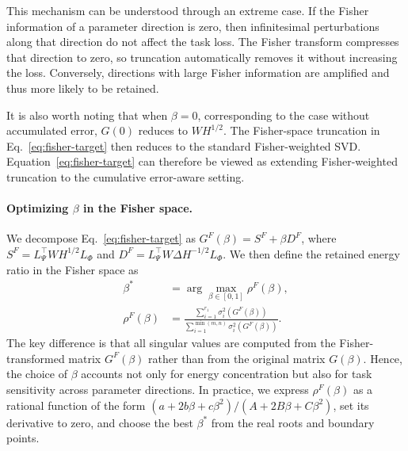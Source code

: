\documentclass[a4paper,fleqn]{cas-dc}
\begin{document}
This mechanism can be understood through an extreme case. If the Fisher information of a parameter direction is zero, then infinitesimal perturbations along that direction do not affect the task loss. The Fisher transform compresses that direction to zero, so truncation automatically removes it without increasing the loss. Conversely, directions with large Fisher information are amplified and thus more likely to be retained.

It is also worth noting that when $\beta = 0$, corresponding to the case without accumulated error, $G(0)$ reduces to $WH^{1/2}$. The Fisher-space truncation in Eq.~\eqref{eq:fisher-target} then reduces to the standard Fisher-weighted SVD. Equation~\eqref{eq:fisher-target} can therefore be viewed as extending Fisher-weighted truncation to the cumulative error-aware setting.

\paragraph{Optimizing $\beta$ in the Fisher space.}
We decompose Eq.~\eqref{eq:fisher-target} as $G^F(\beta) = S^F + \beta D^F$, where $S^F = L_\Psi^\top W H^{1/2} L_\Phi$ and $D^F = L_\Psi^\top W \Delta H^{-1/2} L_\Phi$. We then define the retained energy ratio in the Fisher space as
\begin{equation}
\begin{aligned}
\beta^* &= \arg\max_{\beta \in [0,1]} \rho^F(\beta), \\
\rho^F(\beta) &= \frac{\sum_{i=1}^{r_1} \sigma_i^2(G^F(\beta))}{\sum_{i=1}^{\min(m,n)} \sigma_i^2(G^F(\beta))}.
\end{aligned}
\label{eq:fisher-rer}
\end{equation}
The key difference is that all singular values are computed from the Fisher-transformed matrix $G^F(\beta)$ rather than from the original matrix $G(\beta)$. Hence, the choice of $\beta$ accounts not only for energy concentration but also for task sensitivity across parameter directions. In practice, we express $\rho^F(\beta)$ as a rational function of the form $(a + 2b\beta + c\beta^2)/(A + 2B\beta + C\beta^2)$, set its derivative to zero, and choose the best $\beta^*$ from the real roots and boundary points.
\end{document}
